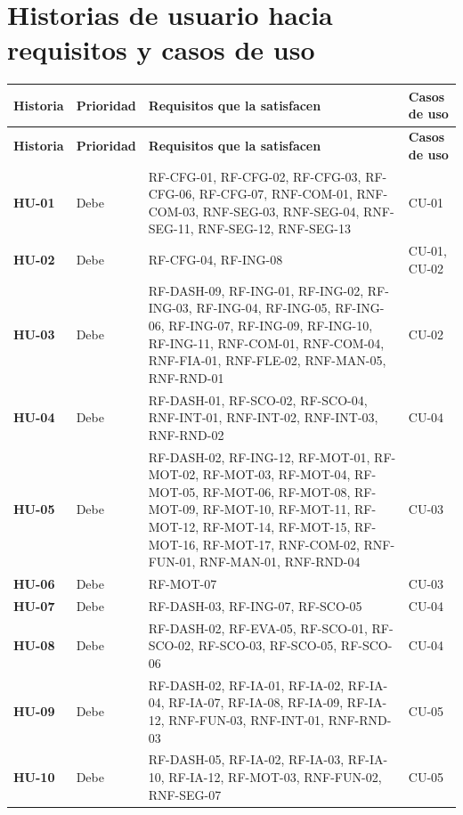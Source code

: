 \documentclass[11pt,a4paper]{report}
\begin{document}
\section{Historias de usuario hacia requisitos y casos de uso}

\begin{xltabular}{\linewidth}{@{}p{1.6cm}p{1.6cm}Xp{2cm}@{}}
\toprule
\textbf{Historia} & \textbf{Prioridad} & \textbf{Requisitos que la satisfacen} & \textbf{Casos de uso} \\
\midrule
\endfirsthead
\toprule
\textbf{Historia} & \textbf{Prioridad} & \textbf{Requisitos que la satisfacen} & \textbf{Casos de uso} \\
\midrule
\endhead
\bottomrule
\endlastfoot

\textbf{HU-01} & Debe & {\footnotesize RF-CFG-01, RF-CFG-02, RF-CFG-03, RF-CFG-06, RF-CFG-07, RNF-COM-01, RNF-COM-03, RNF-SEG-03, RNF-SEG-04, RNF-SEG-11, RNF-SEG-12, RNF-SEG-13} & CU-01 \\
\textbf{HU-02} & Debe & {\footnotesize RF-CFG-04, RF-ING-08} & CU-01, CU-02 \\
\textbf{HU-03} & Debe & {\footnotesize RF-DASH-09, RF-ING-01, RF-ING-02, RF-ING-03, RF-ING-04, RF-ING-05, RF-ING-06, RF-ING-07, RF-ING-09, RF-ING-10, RF-ING-11, RNF-COM-01, RNF-COM-04, RNF-FIA-01, RNF-FLE-02, RNF-MAN-05, RNF-RND-01} & CU-02 \\
\textbf{HU-04} & Debe & {\footnotesize RF-DASH-01, RF-SCO-02, RF-SCO-04, RNF-INT-01, RNF-INT-02, RNF-INT-03, RNF-RND-02} & CU-04 \\
\textbf{HU-05} & Debe & {\footnotesize RF-DASH-02, RF-ING-12, RF-MOT-01, RF-MOT-02, RF-MOT-03, RF-MOT-04, RF-MOT-05, RF-MOT-06, RF-MOT-08, RF-MOT-09, RF-MOT-10, RF-MOT-11, RF-MOT-12, RF-MOT-14, RF-MOT-15, RF-MOT-16, RF-MOT-17, RNF-COM-02, RNF-FUN-01, RNF-MAN-01, RNF-RND-04} & CU-03 \\
\textbf{HU-06} & Debe & {\footnotesize RF-MOT-07} & CU-03 \\
\textbf{HU-07} & Debe & {\footnotesize RF-DASH-03, RF-ING-07, RF-SCO-05} & CU-04 \\
\textbf{HU-08} & Debe & {\footnotesize RF-DASH-02, RF-EVA-05, RF-SCO-01, RF-SCO-02, RF-SCO-03, RF-SCO-05, RF-SCO-06} & CU-04 \\
\textbf{HU-09} & Debe & {\footnotesize RF-DASH-02, RF-IA-01, RF-IA-02, RF-IA-04, RF-IA-07, RF-IA-08, RF-IA-09, RF-IA-12, RNF-FUN-03, RNF-INT-01, RNF-RND-03} & CU-05 \\
\textbf{HU-10} & Debe & {\footnotesize RF-DASH-05, RF-IA-02, RF-IA-03, RF-IA-10, RF-IA-12, RF-MOT-03, RNF-FUN-02, RNF-SEG-07} & CU-05 \\

\end{xltabular}
\end{document}
